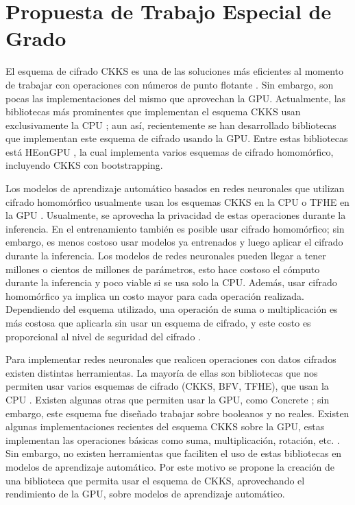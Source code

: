 \chapter{Propuesta de Trabajo Especial de Grado}

El esquema de cifrado CKKS es una de las soluciones más eficientes al momento de trabajar con operaciones con números de punto flotante \cite{CKKS17}. Sin embargo, son pocas las implementaciones del mismo que aprovechan la GPU. Actualmente, las bibliotecas más prominentes que implementan el esquema CKKS usan exclusivamente la CPU \cite{SEAL, Halevi14, PALISADE}; aun así, recientemente se han desarrollado bibliotecas que implementan este esquema de cifrado usando la GPU. Entre estas bibliotecas está HEonGPU \cite{HEonGPU}, la cual implementa varios esquemas de cifrado homomórfico, incluyendo CKKS con bootstrapping.

Los modelos de aprendizaje automático basados en redes neuronales que utilizan cifrado homomórfico usualmente usan los esquemas CKKS en la CPU \cite{SEAL} o TFHE en la GPU \cite{Concrete}. Usualmente, se aprovecha la privacidad de estas operaciones durante la inferencia. En el entrenamiento también es posible usar cifrado homomórfico; sin embargo, es menos costoso usar modelos ya entrenados y luego aplicar el cifrado durante la inferencia. Los modelos de redes neuronales pueden llegar a tener millones o cientos de millones de parámetros, esto hace costoso el cómputo durante la inferencia y poco viable si se usa solo la CPU. Además, usar cifrado homomórfico ya implica un costo mayor para cada operación realizada. Dependiendo del esquema utilizado, una operación de suma o multiplicación es más costosa que aplicarla sin usar un esquema de cifrado, y este costo es proporcional al nivel de seguridad del cifrado \cite{Acar18}.

Para implementar redes neuronales que realicen operaciones con datos cifrados existen distintas herramientas. La mayoría de ellas son bibliotecas que nos permiten usar varios esquemas de cifrado (CKKS, BFV, TFHE), que usan la CPU \cite{SEAL, Halevi14, PALISADE}. Existen algunas otras que permiten usar la GPU, como Concrete \cite{Concrete}; sin embargo, este esquema fue diseñado trabajar sobre booleanos y no reales. Existen algunas implementaciones recientes del esquema CKKS sobre la GPU, estas implementan las operaciones básicas como suma, multiplicación, rotación, etc. \cite{Turkoglu22, HEonGPU}. Sin embargo, no existen herramientas que faciliten el uso de estas bibliotecas en modelos de aprendizaje automático. Por este motivo se propone la creación de una biblioteca que permita usar el esquema de CKKS, aprovechando el rendimiento de la GPU, sobre modelos de aprendizaje automático.

